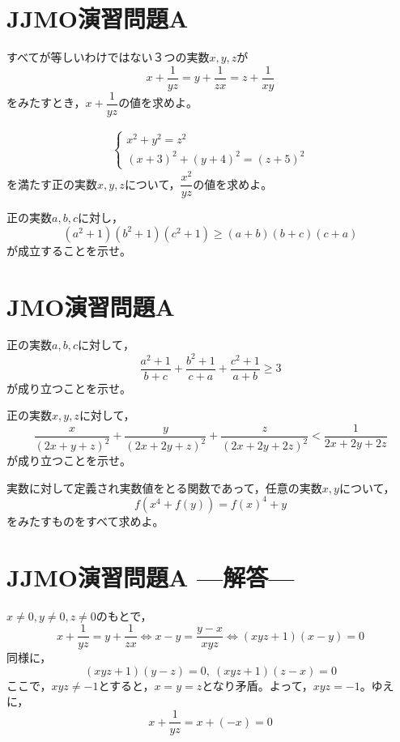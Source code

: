 \documentclass[a4paper,12pt]{jsarticle}
\begin{document}
\section*{JJMO演習問題A} %

すべてが等しいわけではない３つの実数$x,y,z$が
$$ x+\frac{1}{yz} = y+\frac{1}{zx} = z+\frac{1}{xy} $$
をみたすとき，$x+\dfrac{1}{yz}$の値を求めよ。

\bigskip

\begin{eqnarray*}
  \begin{cases}
    x^{2} + y^{2} = z^{2} \\
    (x+3)^{2} + (y+4)^{2} = (z+5)^{2} 
  \end{cases}
\end{eqnarray*}
を満たす正の実数$x,y,z$について，$\dfrac{x^{2}}{yz}$の値を求めよ。
\bigskip

正の実数$a,b,c$に対し，
$$ (a^{2}+1)(b^{2}+1)(c^{2}+1) \geq (a+b)(b+c)(c+a) $$
が成立することを示せ。

\newpage

\section*{JMO演習問題A} %

\bigskip

正の実数$a,b,cに対して，$
$$ \frac {a^{2}+1}{b+c}+\frac {b^{2}+1}{c+a}+\frac {c^{2}+1}{a+b} \ge 3$$
が成り立つことを示せ。

\bigskip


正の実数$x,y,z$に対して，
$$ \frac{x}{(2x+y+z)^{2}}+\frac{y}{(2x+2y+z)^{2}}+\frac{z}{(2x+2y+2z)^{2}} < \frac{1}{2x+2y+2z}$$
が成り立つことを示せ。

\bigskip


実数に対して定義され実数値をとる関数であって，任意の実数$x,y$について，
$$ f(x^{4}+f(y)) = f(x)^{4}+y$$
をみたすものをすべて求めよ。
\newpage

\section*{JJMO演習問題A ---解答---} %


$x\neq0, y \neq 0, z \neq 0$のもとで，
$$ x+\frac{1}{yz} = y+\frac{1}{zx} \Leftrightarrow x-y = \frac{y-x}{xyz} \Leftrightarrow (xyz+1)(x-y) = 0 $$
同様に，
$$ (xyz+1)(y-z) = 0,\ (xyz+1)(z-x) = 0 $$
ここで，$xyz \neq -1$とすると，$x=y=z$となり矛盾。よって，$xyz = -1$。ゆえに，
$$ x+\frac{1}{yz} = x+(-x) = 0$$
\end{document}

